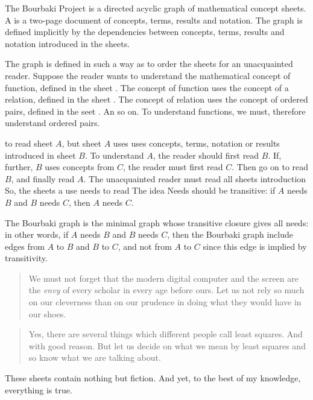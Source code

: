 
\sbasic

\sstart
{}

The Bourbaki Project is a directed acyclic graph of
mathematical concept sheets.
A  is a two-page document of
concepts, terms, results and notation.
The graph is defined implicitly by
the dependencies between concepts, terms,
results and notation introduced in the sheets.

The graph is defined in such a way as to
order the sheets for an unacquainted reader.
Suppose the reader wants to understand the
mathematical concept of function, defined
in the sheet .
The concept of function uses the concept of a
relation,
defined in the sheet .
The concept of relation uses the
concept of ordered pairs, defined in
the seet .
An so on.
To understand functions, we must, therefore
understand ordered pairs.

to read sheet
$A$, but sheet $A$ uses
uses concepts, terms,
notation or results introduced in sheet $B$.
To understand $A$, the reader should first read $B$.
If, further, $B$ uses concepts from $C$, the reader
must first read $C$.
Then go on to read $B$, and finally read $A$.
The unacquainted reader must read all
sheets introduction
So, the sheets a use needs to read
The idea
Needs should be transitive: if $A$ needs
$B$ and $B$ needs $C$, then $A$ needs $C$.


The Bourbaki graph is the minimal graph
whose transitive closure gives all
needs: in other words, if $A$ needs $B$
and $B$ needs $C$, then the Bourbaki
graph include edges from $A$ to $B$ and
$B$ to $C$, and not from $A$ to $C$ since
this edge is implied by transitivity.

\begin{quote}
We must not forget that the
modern digital computer and
the screen are the \textit{envy} of
every scholar in every age
before ours. Let us not rely
so much
on our cleverness
than on our prudence in doing
what they would have in our shoes.
\end{quote}

\begin{quote}
Yes, there are several things
which different people call
least squares. And with good
reason. But let us decide on
what we mean by least squares
and so know what we are talking
about.
\end{quote}

These sheets contain nothing
but fiction. And yet, to the best
of my knowledge, everything
is true.

\strats
